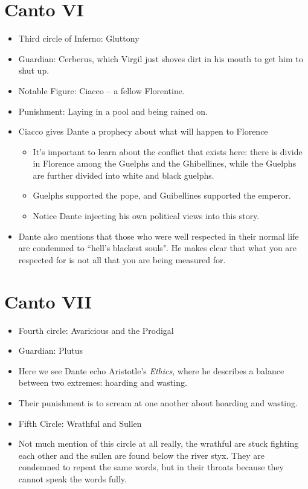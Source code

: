 \documentclass[10pt]{article}
\begin{document}
	\section{Canto VI}
	\begin{itemize}
		\item Third circle of Inferno: Gluttony
		\item Guardian: Cerberus, which Virgil just shoves dirt in his mouth to get him to shut up.
		\item Notable Figure: Ciacco -- a fellow Florentine.
		\item Punishment: Laying in a pool and being rained on. 
		\item Ciacco gives Dante a prophecy about what will happen to Florence
			\begin{itemize}
				\item It's important to learn about the conflict that exists here: there is divide in Florence
					among the Guelphs and the Ghibellines, while the Guelphs are further divided into 
					white and black guelphs. 
				\item Guelphs supported the pope, and Guibellines supported the emperor.  
				\item Notice Dante injecting his own political views into this story.
			\end{itemize}	
		\item Dante also mentions that those who were well respected in their normal life are condemned to 
			``hell's blackest souls". He makes clear that what you are respected for is not all that 
			you are being measured for.
	\end{itemize}
	\section{Canto VII}
	\begin{itemize}
		\item Fourth circle: Avaricious and the Prodigal
		\item Guardian: Plutus 
		\item Here we see Dante echo Aristotle's \textit{Ethics}, where he describes a balance between 
			two extremes: hoarding and wasting.  
		\item Their punishment is to scream at one another about hoarding and wasting. 
		\item Fifth Circle: Wrathful and Sullen
		\item Not much mention of this circle at all really, the wrathful are stuck fighting each other 
			and the sullen are found below the river styx. They are condemned to repeat the same words, but 
			in their throats because they cannot speak the words fully.
	\end{itemize}
\end{document}
